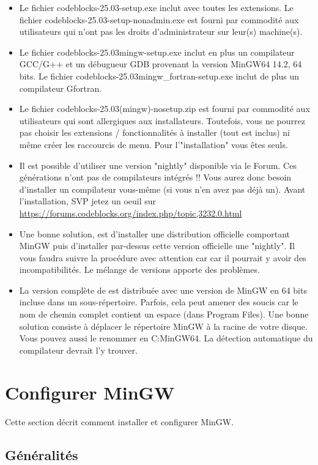 \begin{itemize}
\item Le fichier codeblocks-25.03-setup.exe inclut \codeblocks avec toutes les extensions. Le fichier codeblocks-25.03-setup-nonadmin.exe est fourni par commodité aux utilisateurs qui n'ont pas les droits d'administrateur sur leur(s) machine(s).
\item Le fichier codeblocks-25.03mingw-setup.exe inclut en plus un compilateur GCC/G++ et un débugueur GDB provenant la version MinGW64 14.2, 64 bits. Le fichier codeblocks-25.03mingw\_fortran-setup.exe inclut de plus un compilateur Gfortran.
\item Le fichier codeblocks-25.03(mingw)-nosetup.zip est fourni par commodité aux utilisateurs qui sont allergiques aux installateurs. Toutefois, vous ne pourrez pas choisir les extensions / fonctionnalités à installer (tout est inclus) ni même créer les raccourcis de menu. Pour l'"installation" vous êtes seuls.
\item Il est possible d'utiliser une version "nightly" disponible via le Forum. Ces générations n'ont pas de compilateurs intégrés !! Vous aurez donc besoin d'installer un compilateur vous-même (si vous n'en avez pas déjà un). Avant l'installation, SVP jetez un oeuil sur \url{https://forums.codeblocks.org/index.php/topic,3232.0.html} 
\item Une bonne solution, est d'installer une distribution officielle comportant MinGW puis d'installer par-dessus cette version officielle une "nightly". Il vous faudra suivre la procédure avec attention car car il pourrait y avoir des incompatibilités. Le mélange de versions apporte des problèmes. 
\item La version complète de \codeblocks est distribuée avec une version de MinGW en 64 bits incluse dans un sous-répertoire. Parfois, cela peut amener des soucis car le nom de chemin complet contient un espace (dans Program Files). Une bonne solution consiste à déplacer le répertoire MinGW à la racine de votre disque. Vous pouvez aussi le renommer en C:\osp MinGW64. La détection automatique du compilateur devrait l'y trouver.
\end{itemize}

\section{Configurer MinGW}

Cette section décrit comment installer et configurer MinGW.

\subsection{Généralités}

